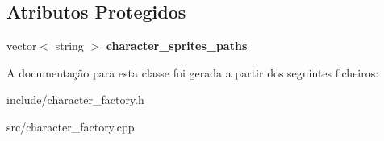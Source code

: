 \subsection*{Atributos Protegidos}
\begin{DoxyCompactItemize}
\item 
\mbox{\label{classCharacterFactory_a21ae7bb6f5514e39489e05ec0c806d16}} 
vector$<$ string $>$ {\bfseries character\+\_\+sprites\+\_\+paths}
\end{DoxyCompactItemize}


A documentação para esta classe foi gerada a partir dos seguintes ficheiros\+:\begin{DoxyCompactItemize}
\item 
include/character\+\_\+factory.\+h\item 
src/character\+\_\+factory.\+cpp\end{DoxyCompactItemize}
